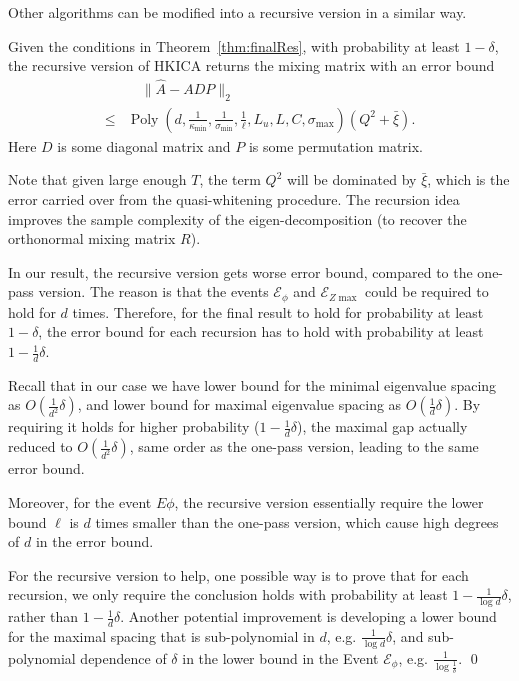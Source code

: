 \documentclass[twoside,11pt]{article}
\newcommand{\Ephi}{\mathcal{E}_{\phi}}
\newcommand{\Ez}{\mathcal{E}_{Z\max}}
\DeclareMathOperator{\pol}{Poly}
\newcommand{\poly}[1]{\pol\left(#1\right)}
\begin{document}
\begin{remark}
Other algorithms can be modified into a recursive version in a similar way. 
\end{remark}
\begin{theorem}
\label{thm:recursiveAlg}
Given the conditions in Theorem~\ref{thm:finalRes}, with probability at least $1-\delta$, the recursive version of HKICA returns the mixing matrix with an error bound
\begin{align*}
& \quad \| \hat{A} - ADP\|_2 \\
\le & \poly{d,\frac{1}{\kappa_{\min}}, \frac{1}{\sigma_{\min}}, \frac{1}{\ell}, L_u, L, C, \sigma_{\max}}(Q^2 + \bar{\xi}).
\end{align*}
Here $D$ is some diagonal matrix and $P$ is some permutation matrix.
\end{theorem} 
\begin{remark}
Note that given large enough $T$, the term $Q^2$ will be dominated by $\bar{\xi}$, which is the error carried over from the quasi-whitening procedure.
The recursion idea improves the sample complexity of the eigen-decomposition (to recover the orthonormal mixing matrix $R$).  
\end{remark}

\begin{remark}
In our result, the recursive version gets worse error bound, compared to the one-pass version. The reason is that the events $\Ephi$ and $\Ez$ could be required to hold for $d$ times. Therefore, for the final result to hold for probability at least $1-\delta$, the error bound for each recursion has to hold with probability at least $1-\frac{1}{d}\delta$. 

Recall that in our case we have lower bound for the minimal eigenvalue spacing as $O(\frac{1}{d^2}\delta)$, and lower bound for maximal eigenvalue spacing as $O(\frac{1}{d}\delta)$. By requiring it holds for higher probability ($1-\frac{1}{d}\delta$), the maximal gap actually reduced to $O(\frac{1}{d^2}\delta)$, same order as the one-pass version, leading to the same error bound.

Moreover, for the event $E\phi$, the recursive version essentially require the lower bound $\ell$ is $d$ times smaller than the one-pass version, which cause high degrees of $d$ in the error bound.

For the recursive version to help, one possible way is to prove that for each recursion, we only require the conclusion holds with probability at least $1-\frac{1}{\log d}\delta$, rather than $1-\frac{1}{d}\delta$. 
Another potential improvement is developing a lower bound for the maximal spacing that is sub-polynomial in $d$, e.g. $\frac{1}{\log d}\delta$, and sub-polynomial dependence of $\delta$ in the lower bound in the Event $\Ephi$, e.g. $\frac{1}{\log \frac{1}{\delta}}$.    
\qed
\end{remark}
\fi
\end{document}
